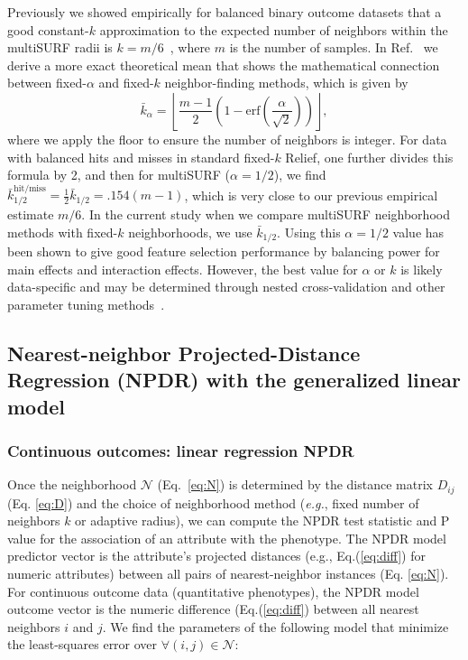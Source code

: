 \documentclass[10pt]{article}
\begin{document}
Previously we showed empirically for balanced binary outcome datasets that a good constant-$k$ approximation to the expected number of neighbors within the multiSURF radii is $k=m/6$~\cite{stir}, where $m$ is the number of samples. In Ref.~\cite{bod} we derive a more exact theoretical mean that shows the mathematical connection between fixed-$\alpha$ and fixed-$k$ neighbor-finding methods, which is given by 
\begin{equation}\label{eq:kbar}
{\bar{k}}_{\alpha} = \left \lfloor \frac{m-1}{2}  \left( 1 - \mathrm{erf}\left( \frac{\alpha}{\sqrt{2}} \right) \right) \right \rfloor,
\end{equation}
where we apply the floor to ensure the number of neighbors is integer. For data with balanced hits and misses in standard fixed-$k$ Relief, one further divides this formula by 2, and then for multiSURF ($\alpha=1/2$), we find $\bar{k}_{1/2}^{\text{hit/miss}} = \frac{1}{2}\bar{k}_{1/2} = .154 (m-1)$, which is very close to our previous empirical estimate $m/6$. In the current study when we compare multiSURF neighborhood methods with fixed-$k$ neighborhoods, we use $\bar{k}_{1/2}$. Using this $\alpha=1/2$ value has been shown to give good feature selection performance by balancing power for main effects and interaction effects. However, the best value for $\alpha$ or $k$ is likely data-specific and may be determined through nested cross-validation and other parameter tuning methods~\cite{bod}. 

\subsection{Nearest-neighbor Projected-Distance Regression (NPDR) with the generalized linear model}

\subsubsection{Continuous outcomes: linear regression NPDR}\label{sec:regress}

Once the neighborhood $\mathcal{N}$ (Eq.~\ref{eq:N}) is determined by the distance matrix $D_{ij}$ (Eq. \ref{eq:D}) and the choice of neighborhood method ({\it e.g.}, fixed number of neighbors $k$ or adaptive radius), we can compute the NPDR test statistic and P value for the association of an attribute with the phenotype. The NPDR model predictor vector is the attribute's projected distances (e.g., Eq.(\ref{eq:diff}) for numeric attributes) between all pairs of nearest-neighbor instances (Eq. \ref{eq:N}). For continuous outcome data (quantitative phenotypes), the NPDR model outcome vector is the numeric difference (Eq.(\ref{eq:diff}) between all nearest neighbors $i$ and $j$. We find the parameters of the following model that minimize the least-squares error over $\forall(i,j) \in \mathcal{N}$: 
\end{document}
